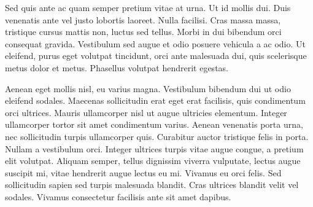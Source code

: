 Sed quis ante ac quam semper pretium vitae at urna. Ut id mollis dui.
Duis venenatis ante vel justo lobortis laoreet. Nulla facilisi. Cras
massa massa, tristique cursus mattis non, luctus sed tellus. Morbi in
dui bibendum orci consequat gravida. Vestibulum sed augue et odio
posuere vehicula a ac odio. Ut eleifend, purus eget volutpat
tincidunt, orci ante malesuada dui, quis scelerisque metus dolor et
metus. Phasellus volutpat hendrerit egestas.

Aenean eget mollis nisl, eu varius magna. Vestibulum bibendum dui ut
odio eleifend sodales. Maecenas sollicitudin erat eget erat facilisis,
quis condimentum orci ultrices. Mauris ullamcorper nisl ut augue
ultricies elementum. Integer ullamcorper tortor sit amet condimentum
varius. Aenean venenatis porta urna, nec sollicitudin turpis
ullamcorper quis. Curabitur auctor tristique felis in porta. Nullam a
vestibulum orci. Integer ultrices turpis vitae augue congue, a pretium
elit volutpat. Aliquam semper, tellus dignissim viverra vulputate,
lectus augue suscipit mi, vitae hendrerit augue lectus eu mi. Vivamus
eu orci felis. Sed sollicitudin sapien sed turpis malesuada blandit.
Cras ultrices blandit velit vel sodales. Vivamus consectetur facilisis
ante sit amet dapibus.

